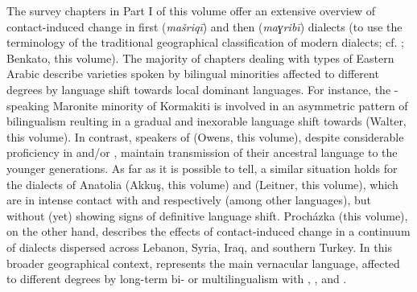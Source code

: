 \documentclass[output=paper]{langsci/langscibook}
\begin{document}
The survey chapters in Part I of this volume offer an extensive overview of contact-induced change in first  (\textit{mašriqī}) and then  (\textit{maɣribī})  dialects (to use the terminology of the traditional geographical classification of modern  dialects; cf. \citealt{Palva2009}; Benkato, this volume). The majority of chapters dealing with types of Eastern Arabic describe varieties spoken by bilingual minorities affected to different degrees by {language shift} towards local dominant languages. For instance, the -speaking Maronite minority of {Kormakiti} is involved in an asymmetric pattern of {bilingualism} reulting in a gradual and inexorable {language shift} towards  (Walter, this volume). In contrast, speakers of   (Owens, this volume), despite considerable proficiency in  and/or , maintain {transmission} of their ancestral language to the younger generations. As far as it is possible to tell, a similar situation holds for the  dialects of {Anatolia} (Akkuş, this volume) and  (Leitner, this volume), which are in intense contact with  and  respectively (among other languages), but without (yet) showing signs of definitive {language shift}. Procházka (this volume), on the other hand, describes the effects of contact-induced change in a continuum of   dialects dispersed across Lebanon, Syria, Iraq, and southern Turkey. In this broader geographical context,  represents the main vernacular language, affected to different degrees by long-term bi- or multilingualism with , , and .
\end{document}
